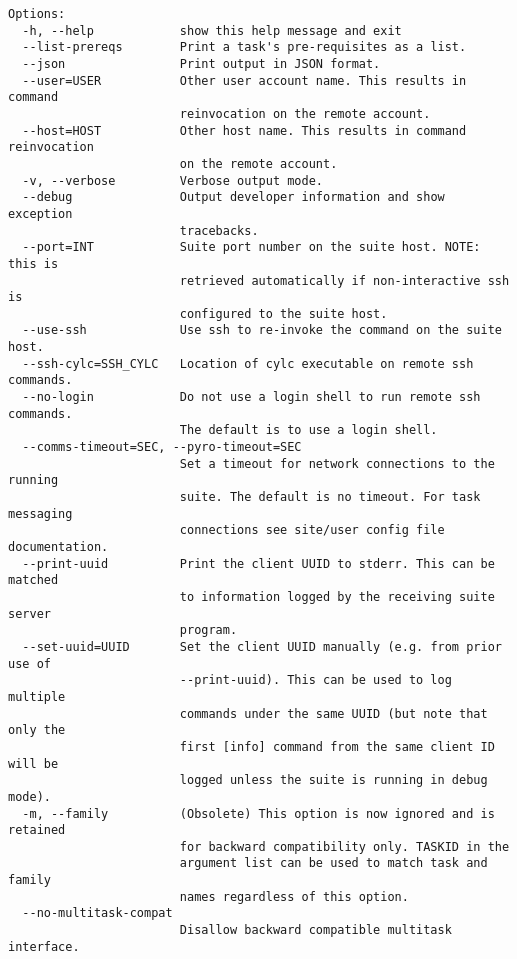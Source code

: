 \begin{lstlisting}
Options:
  -h, --help            show this help message and exit
  --list-prereqs        Print a task's pre-requisites as a list.
  --json                Print output in JSON format.
  --user=USER           Other user account name. This results in command
                        reinvocation on the remote account.
  --host=HOST           Other host name. This results in command reinvocation
                        on the remote account.
  -v, --verbose         Verbose output mode.
  --debug               Output developer information and show exception
                        tracebacks.
  --port=INT            Suite port number on the suite host. NOTE: this is
                        retrieved automatically if non-interactive ssh is
                        configured to the suite host.
  --use-ssh             Use ssh to re-invoke the command on the suite host.
  --ssh-cylc=SSH_CYLC   Location of cylc executable on remote ssh commands.
  --no-login            Do not use a login shell to run remote ssh commands.
                        The default is to use a login shell.
  --comms-timeout=SEC, --pyro-timeout=SEC
                        Set a timeout for network connections to the running
                        suite. The default is no timeout. For task messaging
                        connections see site/user config file documentation.
  --print-uuid          Print the client UUID to stderr. This can be matched
                        to information logged by the receiving suite server
                        program.
  --set-uuid=UUID       Set the client UUID manually (e.g. from prior use of
                        --print-uuid). This can be used to log multiple
                        commands under the same UUID (but note that only the
                        first [info] command from the same client ID will be
                        logged unless the suite is running in debug mode).
  -m, --family          (Obsolete) This option is now ignored and is retained
                        for backward compatibility only. TASKID in the
                        argument list can be used to match task and family
                        names regardless of this option.
  --no-multitask-compat
                        Disallow backward compatible multitask interface.
\end{lstlisting}
